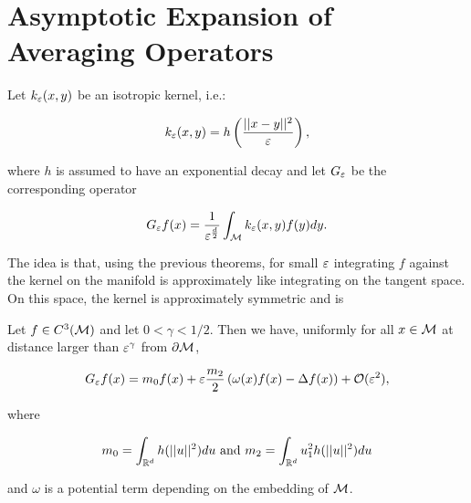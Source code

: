 \section{Asymptotic Expansion of Averaging Operators}
Let $k_\varepsilon(x,y)$ be an isotropic kernel, i.e.:

\begin{equation*}
k_\varepsilon(x,y)=h\left(\frac{||x-y||^2}{\varepsilon} \right),
\end{equation*}

where $h$ is assumed to have an exponential decay and let $G_\varepsilon$ be the corresponding operator

\begin{equation*}
G_\varepsilon f(x)=\frac{1}{\varepsilon^\frac{d}{2}}\int_{\mathcal{M}} k_\varepsilon(x,y)f(y)dy.
\end{equation*}

The idea is that, using the previous theorems, for small $\varepsilon$ integrating $f$ against the kernel on the manifold is approximately like integrating on the tangent space. On this space, the kernel is approximately symmetric and is 

\begin{theorem}
Let $f\in C^3(\mathcal{M})$ and let $0 <\gamma<1/2$. Then we have, uniformly for all $x\in\mathcal{M}$ at distance larger than $\varepsilon^\gamma$ from $\partial\mathcal{M}$,

\begin{equation*}
G_\varepsilon f(x)=m_0 f(x)+\varepsilon\frac{m_2}{2}\left(\omega(x)f(x)-\Delta f(x) \right)+\mathcal{O}(\varepsilon^2),
\end{equation*}

where

\begin{equation*}
m_0=\int_{\mathbb{R}^d} h(||u||^2)du \text{ and } m_2=\int_{\mathbb{R}^d} u_1^2 h(||u||^2)du
\end{equation*}

and $\omega$ is a potential term depending on the embedding of $\mathcal{M}$.
\end{theorem}

